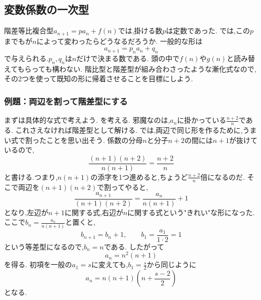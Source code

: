\subsection{変数係数の一次型}\label{節：変数係数の一次型}
階差等比複合型$a_{n+1}=pa_n+f(n)$では,掛ける数$p$は定数であった.
では,この$p$までもが$n$によって変わったらどうなるだろうか.
一般的な形は
\[
  a_{n+1}=p_na_n+q_n
\]
で与えられる.$p_n,q_n$は$n$だけで決まる数である.
頭の中で$f(n)$や$g(n)$と読み替えてもらっても構わない.
階比型と階差型が組み合わさったような漸化式なので,その2つを使って既知の形に帰着させることを目標にしよう.

\subsubsection{例題：両辺を割って階差型にする}
まずは具体的な式で考えよう.
\BookMathLayout{\[
    a_1=2,\qquad
    a_{n+1}=\frac{n+2}{n}a_n+(n+1)(n+2)
    \quad(n\ge1)
  \]}{\[
    \begin{aligned}
      a_1&=2,\\
      a_{n+1}&=\frac{n+2}{n}a_n+(n+1)(n+2)\\
      &\quad(n\ge1)
    \end{aligned}
  \]}
を考える.
邪魔なのは,$a_n$に掛かっている$\frac{n+2}{n}$である.
これさえなければ階差型として解ける.
では,両辺で同じ形を作るために,うまい式で割ったことを思い出そう.
係数の分母$n$と分子$n+2$の間には$n+1$が抜けているので,
\[
  \frac{(n+1)(n+2)}{n(n+1)}=\frac{n+2}{n}
\]
と書ける.つまり,$n(n+1)$の添字を1つ進めると,ちょうど$\frac{n+2}{n}$倍になるのだ.
そこで両辺を$(n+1)(n+2)$で割ってやると,
\[
  \frac{a_{n+1}}{(n+1)(n+2)}
  =\frac{a_n}{n(n+1)}+1
\]
となり,左辺が$n+1$に関する式,右辺が$n$に関する式という"きれい"な形になった.
ここで$b_n=\frac{a_n}{n(n+1)}$と置くと,
\[
  b_{n+1}=b_n+1,\qquad b_1=\frac{a_1}{1\cdot2}=1
\]
という等差型になるので,$b_n=n$である.
したがって
\[
  a_n=n^2(n+1)
\]
を得る.
初項を一般の$a_1=s$に変えても,$b_1=\frac{s}{2}$から同じように
\[
  a_n=n(n+1)\left(n+\frac{s-2}{2}\right)
\]
となる.

